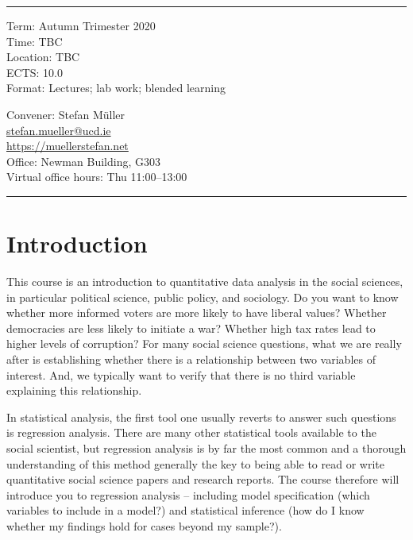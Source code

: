 \documentclass[abstract=on,parskip=full,headings=standardclasses,fontsize=11pt,paper=a4]{scrartcl}
\begin{document}
\vspace{1.5cm}



\hrule
\medskip
\begin{minipage}[t]{0.5\textwidth}
Term: Autumn Trimester 2020 \\
Time: TBC \\
Location:  TBC  \\
ECTS: 10.0 \\
Format: Lectures; lab work; blended learning
\end{minipage}
\begin{minipage}[t]{0.49\textwidth}
\begin{flushright}
Convener: Stefan Müller \\
 \href{mailto:stefan.mueller@ucd.ie}{\textsf{stefan.mueller@ucd.ie}} \\
 \url{https://muellerstefan.net} \\
Office:  Newman Building, G303 \\
Virtual office hours: Thu 11:00--13:00
\end{flushright}
\end{minipage}
\medskip
\hrule 

\section*{Introduction}


This course is an introduction to quantitative data analysis in the social sciences, in particular political science, public policy, and sociology. Do you want to know whether more informed voters are more likely to have liberal values? Whether democracies are less likely to initiate a war? Whether high tax rates lead to higher levels of corruption? For many social science questions, what we are really after is establishing whether there is a relationship between two variables of interest. And, we typically want to verify that there is no third variable explaining this relationship.

In statistical analysis, the first tool one usually reverts  to answer such questions is regression analysis. There are many other statistical tools available to the social scientist, but regression analysis is by far the most common and a thorough understanding of this method generally the key to being able to read or write quantitative social science papers and research reports. The course therefore will introduce you to regression analysis -- including model specification (which variables to include in a model?) and statistical inference (how do I know whether my findings hold for cases beyond my sample?).
\end{document}
